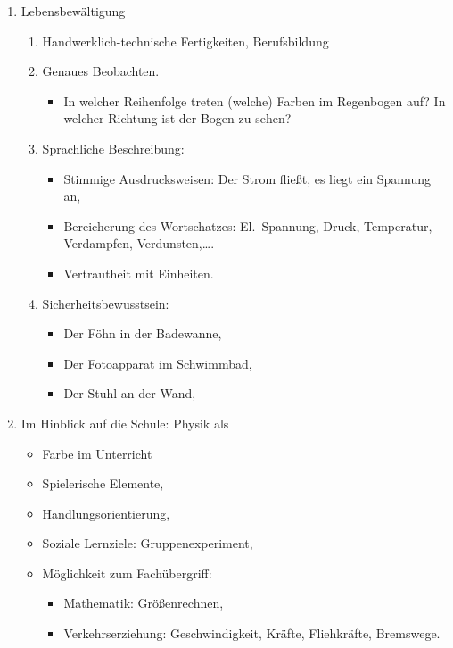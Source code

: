 \begin{enumerate}
\begin{enumerate}
	\end{enumerate}

	\item Lebensbew\"{a}ltigung

	\begin{enumerate}

		\item Handwerklich-technische Fertigkeiten, Berufsbildung
		\item Genaues Beobachten.

		\begin{itemize}
			\item In welcher Reihenfolge treten (welche) Farben im Regenbogen auf? In welcher Richtung ist der Bogen zu sehen?
		\end{itemize}


		\item Sprachliche Beschreibung:
		\begin{itemize}
			\item Stimmige Ausdrucksweisen: Der Strom flie{\ss}t, es liegt ein Spannung an,
			\item Bereicherung des Wortschatzes: El.\ Spannung, Druck, Temperatur, Verdampfen, Verdunsten,\dots.
			\item Vertrautheit mit Einheiten.
		\end{itemize}

		\item Sicherheitsbewusstsein:
		\begin{itemize}
			\item Der F\"{o}hn in der Badewanne,
			\item Der Fotoapparat im Schwimmbad,
			\item Der Stuhl an der Wand,
		\end{itemize}

	\end{enumerate}

	\item Im Hinblick auf die Schule: Physik als 

	\begin{itemize}
		\item Farbe im Unterricht
		\item Spielerische Elemente,
		\item Handlungsorientierung,
		\item Soziale Lernziele: Gruppenexperiment,
		\item M\"{o}glichkeit zum Fach\"{u}bergriff:
		\begin{itemize}
			\item Mathematik: Gr\"{o}{\ss}enrechnen,
			\item Verkehrserziehung: Geschwindigkeit, Kr\"{a}fte, Fliehkr\"{a}fte, Bremswege.
		\end{itemize}


\end{itemize}
\end{enumerate}
